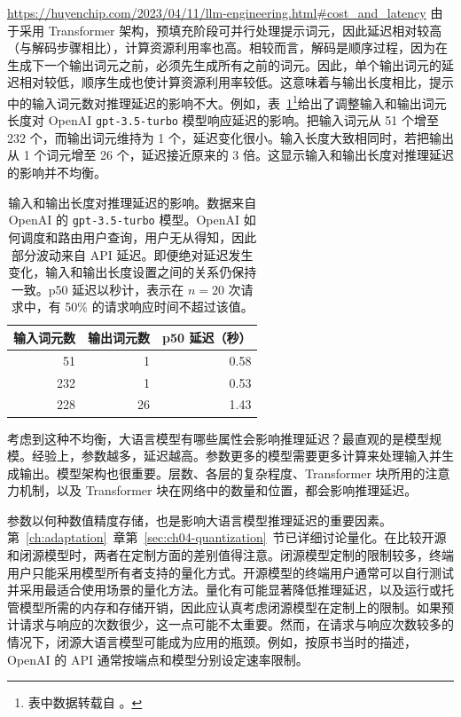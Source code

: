 
\urldef\latencytableurl\url{https://huyenchip.com/2023/04/11/llm-engineering.html#cost_and_latency}
由于采用 Transformer 架构，预填充阶段可并行处理提示词元，因此延迟相对较高（与解码步骤相比），计算资源利用率也高。相较而言，解码是顺序过程，因为在生成下一个输出词元之前，必须先生成所有之前的词元。因此，单个输出词元的延迟相对较低，顺序生成也使计算资源利用率较低。这意味着与输出长度相比，提示中的输入词元数对推理延迟的影响不大。例如，表~\ref{tab:ch08-latency}\footnote{表中数据转载自 \latencytableurl。}给出了调整输入和输出词元长度对 OpenAI \texttt{gpt-3.5-turbo} 模型响应延迟的影响。把输入词元从 51 个增至 232 个，而输出词元维持为 1 个，延迟变化很小。输入长度大致相同时，若把输出从 1 个词元增至 26 个，延迟接近原来的 3 倍。这显示输入和输出长度对推理延迟的影响并不均衡。



\begin{table}[htbp]
\centering
\caption[输入和输出长度对推理延迟的影响]{输入和输出长度对推理延迟的影响。数据来自 OpenAI 的 \texttt{gpt-3.5-turbo} 模型。OpenAI 如何调度和路由用户查询，用户无从得知，因此部分波动来自 API 延迟。即便绝对延迟发生变化，输入和输出长度设置之间的关系仍保持一致。p50 延迟以秒计，表示在 $n=20$ 次请求中，有 50\% 的请求响应时间不超过该值。}
\label{tab:ch08-latency}
\begin{tabular}{rrr}
\toprule
输入词元数 & 输出词元数 & p50 延迟（秒）\\
\midrule
51 & 1 & 0.58\\
232 & 1 & 0.53\\
228 & 26 & 1.43\\
\bottomrule
\end{tabular}
\end{table}

考虑到这种不均衡，大语言模型有哪些属性会影响推理延迟？最直观的是模型规模。经验上，参数越多，延迟越高。参数更多的模型需要更多计算来处理输入并生成输出。模型架构也很重要。层数、各层的复杂程度、Transformer 块所用的注意力机制，以及 Transformer 块在网络中的数量和位置，都会影响推理延迟。

参数以何种数值精度存储，也是影响大语言模型推理延迟的重要因素。第~\ref{ch:adaptation}~章第~\ref{sec:ch04-quantization}~节已详细讨论量化。在比较开源和闭源模型时，两者在定制方面的差别值得注意。闭源模型定制的限制较多，终端用户只能采用模型所有者支持的量化方式。开源模型的终端用户通常可以自行测试并采用最适合使用场景的量化方法。量化有可能显著降低推理延迟，以及运行或托管模型所需的内存和存储开销，因此应认真考虑闭源模型在定制上的限制。如果预计请求与响应的次数很少，这一点可能不太重要。然而，在请求与响应次数较多的情况下，闭源大语言模型可能成为应用的瓶颈。例如，按原书当时的描述，OpenAI 的 API 通常按端点和模型分别设定速率限制。

